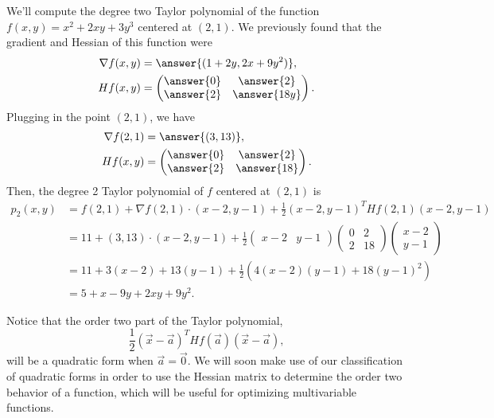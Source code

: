 \documentclass{ximera}
\begin{document}
\begin{example}
We'll compute the degree two Taylor polynomial of the function $f(x,y) = x^2+2xy+3y^3$ centered at $(2,1)$. We previously found that the gradient and Hessian of this function were
\begin{align*}
\nabla f(x,y) &= \answer{(1+2y, 2x+9y^2)},\\
Hf(x,y) &= \begin{pmatrix}
\answer{0} & \answer{2}\\
\answer{2} & \answer{18y}
\end{pmatrix}.
\end{align*}
Plugging in the point $(2,1)$, we have
\begin{align*}
\nabla f(2,1) &= \answer{(3, 13)},\\
Hf(x,y) &= \begin{pmatrix}
\answer{0} & \answer{2}\\
\answer{2} & \answer{18}
\end{pmatrix}.
\end{align*}
Then, the degree 2 Taylor polynomial of $f$ centered at $(2,1)$ is
\begin{align*}
p_2(x,y) &= f(2,1) + \nabla f(2,1)\cdot (x-2,y-1) + \frac{1}{2} (x-2,y-1)^T Hf(2,1)(x-2,y-1)\\
&= 11+ (3,13)\cdot (x-2,y-1) + \frac{1}{2} \begin{pmatrix}x-2 & y-1\end{pmatrix}\begin{pmatrix}
0 & 2\\
2 & 18
\end{pmatrix}\begin{pmatrix}x-2 \\ y-1\end{pmatrix}\\
&= 11 + 3(x-2)+ 13(y-1) + \frac{1}{2}(4(x-2)(y-1)+18(y-1)^2)\\
&= 5 + x -9y + 2xy + 9y^2.
\end{align*}
\end{example}

Notice that the order two part of the Taylor polynomial,
\[
\frac{1}{2} (\vec{x}-\vec{a})^T Hf(\vec{a})(\vec{x}-\vec{a}),
\]
will be a quadratic form when $\vec{a} = \vec{0}$. We will soon make use of our classification of quadratic forms in order to use the Hessian matrix to determine the order two behavior of a function, which will be useful for optimizing multivariable functions.
\end{document}

